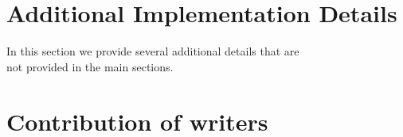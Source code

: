 \clearpage
\appendix
\onecolumn

\section{Additional Implementation Details}

In this section we provide several additional details that are\\
not provided in the main sections.


\section{Contribution of writers}
\label{subsec:membercontribution}
